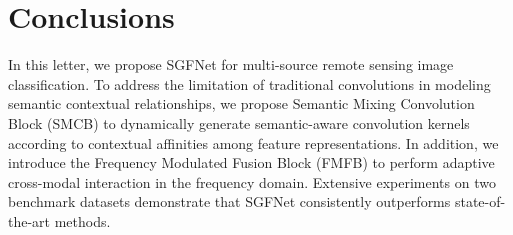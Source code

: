 \section{Conclusions}
\label{sec:conclusion}

In this letter, we propose SGFNet for multi-source remote sensing image classification. To address the limitation of traditional convolutions in modeling semantic contextual relationships, we propose Semantic Mixing Convolution Block (SMCB) to dynamically generate semantic-aware convolution kernels according to contextual affinities among feature representations. In addition, we introduce the Frequency Modulated Fusion Block (FMFB) to perform adaptive cross-modal interaction in the frequency domain. Extensive experiments on two benchmark datasets demonstrate that SGFNet consistently outperforms state-of-the-art methods.
